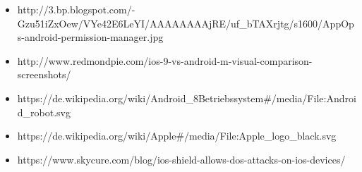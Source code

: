 \begin{frame}
\begin{itemize}
  \item{http://3.bp.blogspot.com/-Gzu51iZxOew/VYe42E6LeYI/AAAAAAAAjRE/uf_bTAXrjtg/s1600/AppOps-android-permission-manager.jpg}
  \item{http://www.redmondpie.com/ios-9-vs-android-m-visual-comparison-screenshots/}
  \item{https://de.wikipedia.org/wiki/Android_\28Betriebssystem#/media/File:Android_robot.svg}
  \item{https://de.wikipedia.org/wiki/Apple#/media/File:Apple_logo_black.svg}
  \item{https://www.skycure.com/blog/ios-shield-allows-dos-attacks-on-ios-devices/}
\end{itemize}
\end{frame}
